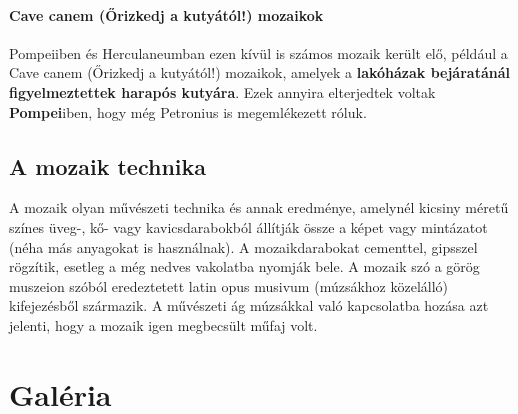 \paragraph{Cave canem (Őrizkedj a kutyától!) mozaikok}
Pompeiiben és Herculaneumban ezen kívül is számos mozaik került elő, például a Cave canem (Őrizkedj a kutyától!) mozaikok, amelyek a \textbf{lakóházak bejáratánál figyelmeztettek harapós kutyára}. Ezek annyira elterjedtek voltak \textbf{Pompei}iben, hogy még Petronius is megemlékezett róluk.

\begin{figure}[H]
	\begin{minipage}{0.47\textwidth}
	\end{minipage}
	\hfill
	\begin{minipage}{0.47\textwidth}
	\end{minipage}
\end{figure}

\subsection*{A mozaik technika}

A mozaik olyan művészeti technika és annak eredménye, amelynél kicsiny méretű színes üveg-, kő- vagy kavicsdarabokból állítják össze a képet vagy mintázatot (néha más anyagokat is használnak). A mozaikdarabokat cementtel, gipsszel rögzítik, esetleg a még nedves vakolatba nyomják bele. A mozaik szó a görög muszeion szóból eredeztetett latin opus musivum (múzsákhoz közelálló) kifejezésből származik. A művészeti ág múzsákkal való kapcsolatba hozása azt jelenti, hogy a mozaik igen megbecsült műfaj volt.

\vspace{2cm}

\section{Galéria}

